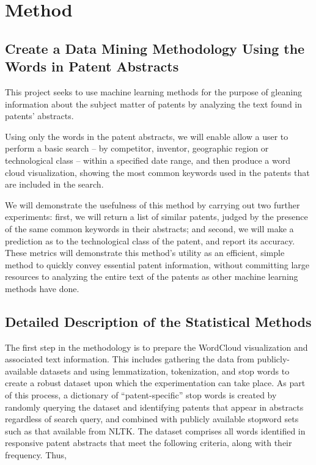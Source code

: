 \documentclass{article}
\begin{document}
\section{Method}
\label{method}

\subsection{Create a Data Mining Methodology Using the Words in Patent Abstracts}
This project seeks to use machine learning methods for the purpose of gleaning information about the subject matter of patents by analyzing the text found in patents’ abstracts.  

Using only the words in the patent abstracts, we will enable allow a user to perform a basic search – by competitor, inventor, geographic region or technological class – within a specified date range, and then produce a word cloud visualization, showing the most common keywords used in the patents that are included in the search.  

We will demonstrate the usefulness of this method  by carrying out two further experiments: first, we will return a list of similar patents, judged by the presence of the same common keywords in their abstracts; and second, we will make a prediction as to the technological class of the patent, and report its accuracy.  These metrics will demonstrate this method’s utility as an efficient, simple method to quickly convey essential patent information, without committing large resources to analyzing the entire text of the patents as other machine learning methods have done.

\subsection{Detailed Description of the Statistical Methods}
The first step in the methodology is to prepare the WordCloud visualization and associated text information.  This includes gathering the data from publicly-available datasets and using lemmatization, tokenization, and stop words to create a robust dataset upon which the experimentation can take place.  As part of this process, a dictionary of “patent-specific” stop words is created by randomly querying the dataset and identifying patents that appear in abstracts regardless of search query, and combined with publicly available stopword sets such as that available from NLTK.  The dataset comprises all words identified in responsive patent abstracts that meet the following criteria, along with their frequency.  Thus,
\end{document}
